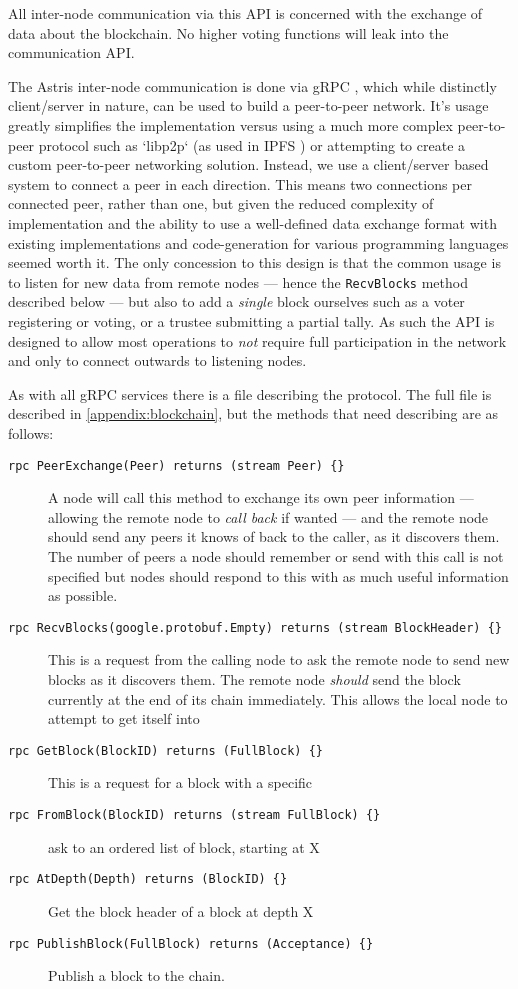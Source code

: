All inter-node communication via this API is concerned with the exchange of data about the blockchain. No higher voting functions will leak into the communication API.

The Astris inter-node communication is done via gRPC  , which while distinctly client/server in nature, can be used to build a peer-to-peer network. It's usage greatly simplifies the implementation versus using a much more complex peer-to-peer protocol such as `libp2p` (as used in IPFS ) or attempting to create a custom peer-to-peer networking solution. Instead, we use a client/server based system to connect a peer in each direction. This means two connections per connected peer, rather than one, but given the reduced complexity of implementation and the ability to use a well-defined data exchange format with existing implementations and code-generation for various programming languages seemed worth it. The only concession to this design is that the common usage is to listen for new data from remote nodes --- hence the \texttt{RecvBlocks} method described below --- but also to add a \emph{single} block ourselves such as a voter registering or voting, or a trustee submitting a partial tally. As such the API is designed to allow most operations to \emph{not} require full participation in the network and only to connect outwards to listening nodes.

As with all gRPC services there is a file describing the protocol. The full file is described in \autoref{appendix:blockchain}, but the methods that need describing are as follows:

\begin{description}
    \item[\texttt{rpc PeerExchange(Peer) returns (stream Peer) \{\}}] A node will call this method to exchange its own peer information --- allowing the remote node to \emph{call back} if wanted --- and the remote node should send any peers it knows of back to the caller, as it discovers them. The number of peers a node should remember or send with this call is not specified but nodes should respond to this with as much useful information as possible.
    \item[\texttt{rpc RecvBlocks(google.protobuf.Empty) returns (stream BlockHeader) \{\}}] This is a request from the calling node to ask the remote node to send new blocks as it discovers them. The remote node \emph{should} send the block currently at the end of its chain immediately. This allows the local node to attempt to get itself into
    \item[\texttt{rpc GetBlock(BlockID) returns (FullBlock) \{\}}] This is a request for a block with a specific
    \item[\texttt{rpc FromBlock(BlockID) returns (stream FullBlock) \{\}}] ask to an ordered list of block, starting at X
    \item[\texttt{rpc AtDepth(Depth) returns (BlockID) \{\}}] Get the block header of a block at depth X
    \item[\texttt{rpc PublishBlock(FullBlock) returns (Acceptance) \{\}}] Publish a block to the chain.
\end{description}


